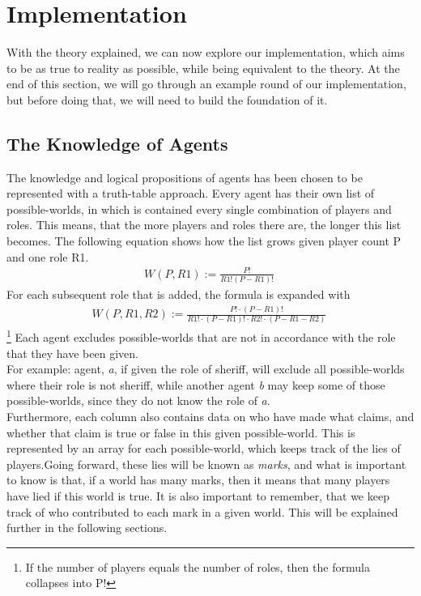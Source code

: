 \section{Implementation}\label{sec:implementation}
With the theory explained, we can now explore our implementation, which aims to
be as true to reality as possible, while being equivalent to the theory. At the
end of this section, we will go through an example round of our implementation,
but before doing that, we will need to build the foundation of it.
\subsection{The Knowledge of Agents}\label{TheKnowledgeOfAgents}
The knowledge and logical propositions of agents has been chosen to be
represented with a truth-table approach. Every agent has their own list of
possible-worlds, in which is contained every single combination of players and
roles. This means, that the more players and roles there are, the longer this
list becomes. The following equation shows how the list grows given player
count P and one role R1.
\begin{gather}
	W(P,R1) := \frac{P!}{R1!(P-R1)!}\
\end{gather}
For each subsequent role that is added, the formula is expanded with
\begin{gather}
	W(P, R1, R2) := \frac{P!\cdot(P-R1)!}{R1!\cdot(P-R1)!\cdot R2!\cdot(P-R1-R2)}\
\end{gather}\footnote{If the number of players equals the number of roles, then the formula collapses into P!}
Each agent excludes possible-worlds that are not in
accordance with the role that they have been given.\\
For example: agent, \textit{a}, if given the role of sheriff, will exclude all
possible-worlds where their role is not sheriff, while another agent \textit{b} may
keep some of those possible-worlds, since they do not know the role of \textit{a}.\\
Furthermore, each column also contains data on who have made what claims, and
whether that claim is true or false in this given possible-world. This is represented
by an array for each possible-world, which keeps track of the lies of players.Going forward, these lies will be known as
\textit{marks}, and what is important to know is that, if a world has many
marks, then it means that many players have lied if this world is true. It is
also important to remember, that we keep track of who contributed to each mark
in a given world. This will be explained further in the following sections.
